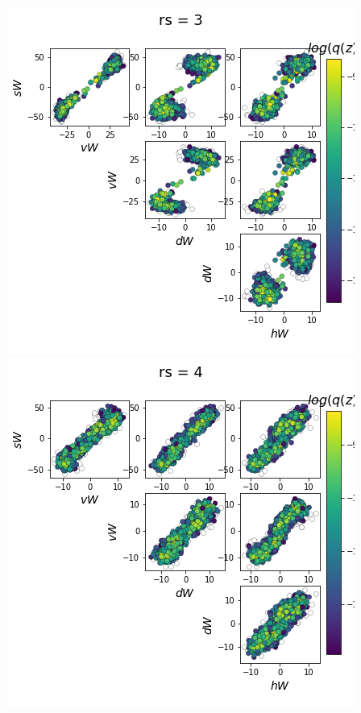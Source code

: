 \documentclass[11pt]{article}
\begin{document}
\begin{center}
\includegraphics[scale=0.33]{figs/Z_SC_reduced_c=15_p=50_rs=3.png} \\
\includegraphics[scale=0.33]{figs/Z_SC_reduced_c=15_p=50_rs=4.png}

\end{center}
\end{document}
